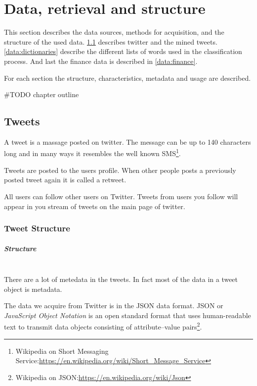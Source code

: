 \chapter{Data, retrieval and structure}

This section describes the data sources, methods for acquisition, and the
structure of the used data. \ref{data:tweets} describes twitter and the mined
tweets. \ref{data:dictionaries} describe the different lists of words used in
the classification process. And last the finance data is described in
\ref{data:finance}.

For each section the structure, characteristics, metadata and usage are
described. 

#TODO chapter outline
%

\section{Tweets}\label{data:tweets}
A tweet is a massage posted on twitter. The message can be up to 140 characters
long and in many ways it resembles the well known
SMS\footnote{Wikipedia on Short Messaging Service:\url{https://en.wikipedia.org/wiki/Short_Message_Service}}.

Tweets are posted to the users profile. When other people posts a previously
posted tweet again it is called a retweet.

All users can follow other users on Twitter. Tweets from users you follow will
appear in you stream of tweets on the main page of twitter.
%

\subsection{Tweet Structure}
\paragraph{Structure}
\hspace{0pt}\\
There are a lot of metedata in the tweets. In fact most of the data in a tweet
object is metadata. 

The data we acquire from Twitter is in the JSON data format. JSON or \textit{JavaScript
Object Notation} is an open standard format that uses human-readable text to
transmit data objects consisting of attribute–value
pairs\footnote{Wikipedia on JSON:\url{https://en.wikipedia.org/wiki/Json}}.


